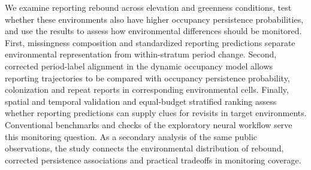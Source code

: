 We examine reporting rebound across elevation and greenness conditions, test whether these environments also have higher occupancy persistence probabilities, and use the results to assess how environmental differences should be monitored. First, missingness composition and standardized reporting predictions separate environmental representation from within-stratum period change. Second, corrected period-label alignment in the dynamic occupancy model allows reporting trajectories to be compared with occupancy persistence probability, colonization and repeat reports in corresponding environmental cells. Finally, spatial and temporal validation and equal-budget stratified ranking assess whether reporting predictions can supply clues for revisits in target environments. Conventional benchmarks and checks of the exploratory neural workflow serve this monitoring question. As a secondary analysis of the same public observations, the study connects the environmental distribution of rebound, corrected persistence associations and practical tradeoffs in monitoring coverage.
